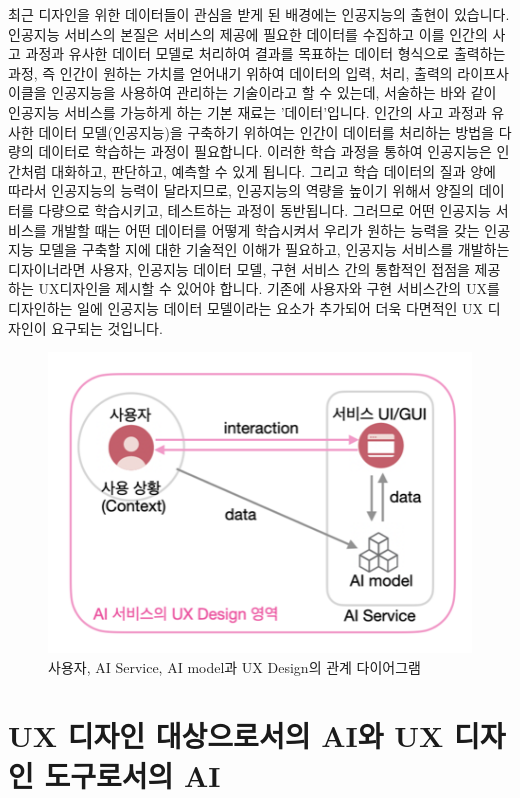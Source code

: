 \documentclass[
  letterpaper,
]{book}
\begin{document}
최근 디자인을 위한 데이터들이 관심을 받게 된 배경에는 인공지능의 출현이
있습니다. 인공지능 서비스의 본질은 서비스의 제공에 필요한 데이터를
수집하고 이를 인간의 사고 과정과 유사한 데이터 모델로 처리하여 결과를
목표하는 데이터 형식으로 출력하는 과정, 즉 인간이 원하는 가치를 얻어내기
위하여 데이터의 입력, 처리, 출력의 라이프사이클을 인공지능을 사용하여
관리하는 기술이라고 할 수 있는데, 서술하는 바와 같이 인공지능 서비스를
가능하게 하는 기본 재료는 '데이터'입니다. 인간의 사고 과정과 유사한
데이터 모델(인공지능)을 구축하기 위하여는 인간이 데이터를 처리하는
방법을 다량의 데이터로 학습하는 과정이 필요합니다. 이러한 학습 과정을
통하여 인공지능은 인간처럼 대화하고, 판단하고, 예측할 수 있게 됩니다.
그리고 학습 데이터의 질과 양에 따라서 인공지능의 능력이 달라지므로,
인공지능의 역량을 높이기 위해서 양질의 데이터를 다량으로 학습시키고,
테스트하는 과정이 동반됩니다. 그러므로 어떤 인공지능 서비스를 개발할
때는 어떤 데이터를 어떻게 학습시켜서 우리가 원하는 능력을 갖는 인공지능
모델을 구축할 지에 대한 기술적인 이해가 필요하고, 인공지능 서비스를
개발하는 디자이너라면 사용자, 인공지능 데이터 모델, 구현 서비스 간의
통합적인 접점을 제공하는 UX디자인을 제시할 수 있어야 합니다. 기존에
사용자와 구현 서비스간의 UX를 디자인하는 일에 인공지능 데이터 모델이라는
요소가 추가되어 더욱 다면적인 UX 디자인이 요구되는 것입니다.

\begin{figure}[H]

{\centering \includegraphics{img/fig1.png}

}

\caption{사용자, AI Service, AI model과 UX Design의 관계 다이어그램}

\end{figure}%

\section{UX 디자인 대상으로서의 AI와 UX 디자인 도구로서의
AI}\label{ux-uxb514uxc790uxc778-uxb300uxc0c1uxc73cuxb85cuxc11cuxc758-aiuxc640-ux-uxb514uxc790uxc778-uxb3c4uxad6cuxb85cuxc11cuxc758-ai}
\end{document}
